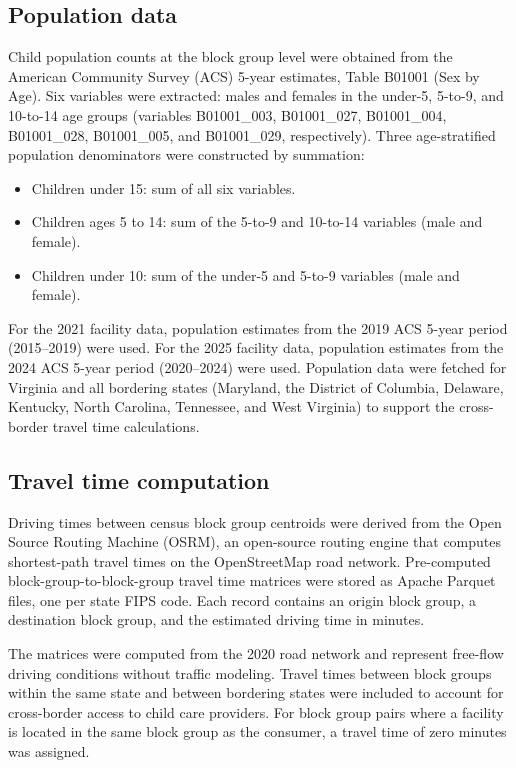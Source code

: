 \documentclass{CUP-JNL-DAP}%
\begin{document}
\subsection{Population data}

Child population counts at the block group level were obtained from the American Community Survey (ACS) 5-year estimates, Table B01001 (Sex by Age)\citep{acs}. Six variables were extracted: males and females in the under-5, 5-to-9, and 10-to-14 age groups (variables B01001\_003, B01001\_027, B01001\_004, B01001\_028, B01001\_005, and B01001\_029, respectively). Three age-stratified population denominators were constructed by summation:

\begin{itemize}
\item Children under 15: sum of all six variables.
\item Children ages 5 to 14: sum of the 5-to-9 and 10-to-14 variables (male and female).
\item Children under 10: sum of the under-5 and 5-to-9 variables (male and female).
\end{itemize}

For the 2021 facility data, population estimates from the 2019 ACS 5-year period (2015--2019) were used. For the 2025 facility data, population estimates from the 2024 ACS 5-year period (2020--2024) were used. Population data were fetched for Virginia and all bordering states (Maryland, the District of Columbia, Delaware, Kentucky, North Carolina, Tennessee, and West Virginia) to support the cross-border travel time calculations.

\subsection{Travel time computation}

Driving times between census block group centroids were derived from the Open Source Routing Machine (OSRM)\citep{luxen2011}, an open-source routing engine that computes shortest-path travel times on the OpenStreetMap road network. Pre-computed block-group-to-block-group travel time matrices were stored as Apache Parquet files, one per state FIPS code. Each record contains an origin block group, a destination block group, and the estimated driving time in minutes.

The matrices were computed from the 2020 road network and represent free-flow driving conditions without traffic modeling. Travel times between block groups within the same state and between bordering states were included to account for cross-border access to child care providers. For block group pairs where a facility is located in the same block group as the consumer, a travel time of zero minutes was assigned.
\end{document}
